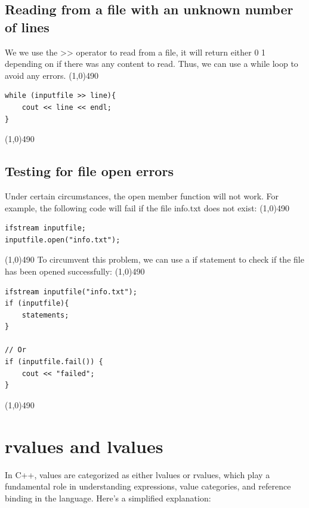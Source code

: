 \documentclass{report}
\begin{document}
    \pagebreak \bigbreak \noindent 
    \subsection{Reading from a file with an unknown number of lines}
    \bigbreak \noindent 
    We we use the >> operator to read from a file, it will return either 0 1 depending on if there was any content to read. Thus, we can use a while loop to avoid any errors.
    \bigbreak \noindent 
    \line(1,0){490}
    \begin{verbatim}
while (inputfile >> line){
    cout << line << endl;
}
    \end{verbatim}
    \line(1,0){490}

    \bigbreak \noindent 
    \subsection{Testing for file open errors}
    \bigbreak \noindent 
    Under certain circumstances, the open member function will not work. For example, the following code will fail if the file info.txt does not exist:
    \bigbreak \noindent 
    \line(1,0){490}
    \begin{verbatim}
ifstream inputfile;
inputfile.open("info.txt");
    \end{verbatim}
    \line(1,0){490}
    \bigbreak \noindent 
    To circumvent this problem, we can use a if statement to check if the file has been opened successfully:
    \bigbreak \noindent 
    \line(1,0){490}
    \begin{verbatim}
ifstream inputfile("info.txt");
if (inputfile){
    statements;
}

// Or
if (inputfile.fail()) {
    cout << "failed";
}
    \end{verbatim}
    \line(1,0){490}

    \pagebreak \bigbreak \noindent 
    \section{\LARGE rvalues and lvalues}
    \bigbreak \noindent 
    In C++, values are categorized as either lvalues or rvalues, which play a fundamental role in understanding expressions, value categories, and reference binding in the language.
    \bigbreak \noindent 
    Here's a simplified explanation:

    \bigbreak \noindent 
\end{document}
